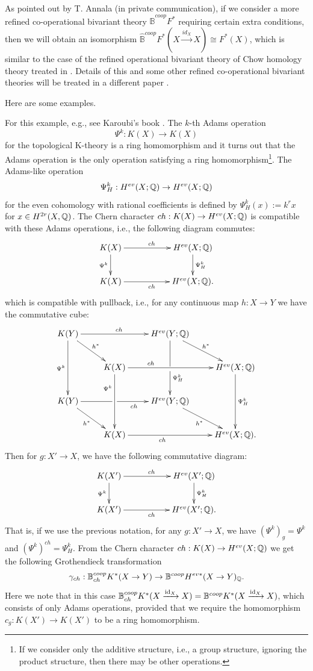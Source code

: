 \documentclass[a4paper]{amsart}
\begin{document}
\begin{rem} As pointed out by T. Annala (in private communication), if we consider a more refined co-operational bivariant theory $ \widehat{\mathbb B}^{coop}F^{*}$ requiring certain extra conditions, then we will obtain an isomorphism $\widehat{\mathbb B}^{coop}F^{*}(X \xrightarrow {id_X} X) \cong F^*(X)$, which is similar to the case of the refined operational bivariant theory of Chow homology theory treated in \cite[\S 17.3]{Ful}.
Details of this and some other refined co-operational bivariant theories will be treated in a different paper \cite{Yo2}.
\end{rem}

Here are some examples.
\begin{ex}\label{Adam} For this example, e.g., see Karoubi's book \cite[IV, 7.13 Theorem and V, 3.37 Theorem]{Kar}.
The $k$-th Adams operation 
$$\Psi^k:K(X) \to K(X)$$
 for the topological K-theory is a ring homomorphism and it turns out that the Adams operation is the only operation satisfying a ring homomorphism\footnote{If we consider only the additive structure, i.e., a group structure, ignoring the product structure, then there may be other operations.}. The Adams-like operation 
$$\Psi^k_H:H^{ev}(X;\mathbb Q) \to H^{ev}(X;\mathbb Q)$$
 for the even cohomology with rational coefficients is defined by
 $\Psi^k_H(x) := k^r x$ for $x \in H^{2r}(X, \mathbb Q)$. The Chern character $ch:K(X) \to H^{ev}(X ;\mathbb Q)$ is compatible with these Adams operations, i.e., the following diagram commutes:
$$
\xymatrix
{
K(X) \ar[d]_{\Psi^k}\ar[rr]^{ch}  && H^{ev}(X;\bQ) \ar[d]^{\Psi^k_H}\\
K(X) \ar[rr]_{ch} && H^{ev}(X;\bQ).
}
$$
which is compatible with pullback, i.e., for any continuous map $h:X \to Y$ we have the commutative cube:
\begin{equation*}
\xymatrix
{ K(Y) \ar[dd]_{\Psi^k } \ar[rd]^{h^*} \ar[rr]^{ch} && H^{ev}(Y;\bQ) \ar'[d][dd]^(.3){\Psi^k_H} \ar[rd]^{h^*} \\
& K(X) \ar[dd]_(.3){\Psi^k} \ar[rr]^(.3){ch}  &&  H^{ev}(X;\bQ)\ar[dd]^{\Psi^k_H} \\
K(Y)\ar'[r] [rr]_{ch \quad \quad }  \ar[rd]_{h^*} && H^{ev}(Y;\bQ)\ar[rd]_{h^*} \\
& K(X) \ar[rr] _{ch \quad \quad  \quad }  &&  H^{ev}(X;\bQ).
}
\end{equation*}
Then for $g:X' \to X$, we have the following commutative diagram:
$$
\xymatrix
{
K(X') \ar[d]_{\Psi^k}\ar[rr]^{ch}  && H^{ev}(X';\bQ) \ar[d]^{\Psi^k_H}\\
K(X') \ar[rr]_{ch} && H^{ev}(X';\bQ).
}
$$
That is, if we use the previous notation, for any $g:X' \to X$, we have $(\Psi ^k)_g = \Psi ^k$ and $(\Psi ^k)^{ch} = \Psi^k_H$.
 From the Chern character $ch:K(X) \to H^{ev}(X ;\mathbb Q)$ we get the following Grothendieck transformation
$$\gamma_{ch}: \mathbb B^{coop}_{ch} K^*(X \to Y)  \to  \mathbb B^{coop} H^{ev *}(X \to Y)_{\mathbb Q}.$$
Here we note that in this case $\mathbb B^{coop}_{ch} K^*(X \xrightarrow {\operatorname{id}_X} X) = \mathbb B^{coop} K^*(X \xrightarrow {\operatorname{id}_X} X)$, which consists of only Adams operations, provided that we require the homomorphism $c_g:K(X') \to K(X')$ to be a ring homomorphism. 
\end{ex}
\end{document}
